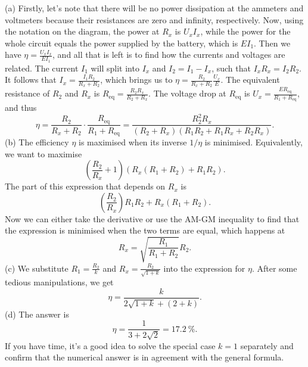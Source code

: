 \documentclass[../TST.tex]{subfiles}
\begin{document}
\ifprob \else
	\begin{solution} (a) Firstly, let's note that there will be no power dissipation at the ammeters and voltmeters because their resistances are zero and infinity, respectively. Now, using the notation on the diagram, the power at $R_x$ is $U_xI_x$, while the power for the whole circuit equals the power supplied by the battery, which is $EI_1$. Then we have $\eta=\frac{U_xI_x}{EI_1}$, and all that is left is to find how the currents and voltages are related.  The current $I_1$ will split into $I_x$ and $I_2=I_1-I_x$, such that $I_xR_x=I_2R_2$. It follows that $I_x=\frac{I_1R_2}{R_x+R_2}$, which brings us to $\eta = \frac{R_2}{R_x+R_2}\frac{U_x}{E}$. The equivalent resistance of $R_2$ and $R_x$ is $R_\mathrm{eq}=\frac{R_2R_x}{R_2+R_x}$. The voltage drop at $R_\mathrm{eq}$ is $U_x=\frac{ER_\mathrm{eq}}{R_1+R_\mathrm{eq}}$, and thus
		\begin{equation*}
			\eta = \frac{R_2}{R_x+R_2}\cdot \frac{R_\mathrm{eq}}{R_1+R_\mathrm{eq}}= \boxed{\frac{R_2^2R_x}{(R_2+R_x)(R_1R_2+R_1R_x+ R_2R_x)}.}
		\end{equation*}
		(b) The efficiency $\eta$ is maximised when its inverse $1/\eta$ is minimised. Equivalently, we want to maximise
		\begin{equation*}
		\left(\frac{R_2}{R_x}+1\right) \left(R_x(R_1+R_2)+R_1R_2\right) 
		.
		\end{equation*}
The part of this expression that depends on $R_x$ is 
\begin{equation*}
\left(\frac{R_2}{R_x}\right) R_1R_2+R_x(R_1+R_2)
.
\end{equation*}
Now we can either take the derivative or use the AM-GM inequality to find that the expression is minimised when the two terms are equal, which happens at
\begin{equation*}
	\boxed{R_x=\sqrt{\frac{R_1}{R_1+R_2}}R_2.}
\end{equation*}
(c) We substitute $R_1=\frac{R_2}{k}$ and $R_x=\frac{R_2}{\sqrt{1+k}}$ into the expression for $\eta$. After some tedious manipulations, we get
\begin{equation*}
	\boxed{\eta = \frac{k}{2\sqrt{1+k}+(2+k)}.}
\end{equation*}
(d) The answer is 
\begin{equation*}
	\eta = \frac{1}{3+2\sqrt{2}} = \boxed{\qty{17.2}{\percent}.}
\end{equation*}
If you have time, it's a good idea to solve the special case $k=1$ separately and confirm that the numerical answer is in agreement with the general formula.

\end{solution}
\fi
\ifprob 
	\clearpage
\else 
	\vspace*{10mm}
\fi
\end{document}
